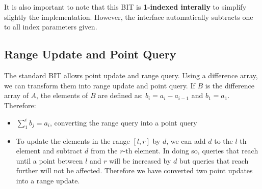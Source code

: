 \documentclass[12pt]{report}
\begin{document}
It is also important to note that this BIT is \textbf{1-indexed interally} to simplify slightly 
the implementation. However, the interface automatically subtracts one to all index parameters
given.
\subsection*{Range Update and Point Query}
The standard BIT allows point update and range query. Using a difference array, we can 
transform them into range update and point query. If $B$ is the difference array
of $A$, the elements of $B$ are defined as:  $b_i=a_i- a_{i-1}$ and $b_1=a_1$.
Therefore:
\begin{itemize}
		\setlength{\itemsep}{2pt}
		\item $\sum_{1}^i b_j=a_i$, converting the range query into 
				a point query
		\item To update the elements in the range $[l,r]$ by $d$, we can add
				$d$ to the $l$-th element and subtract $d$ from the $r$-th element.
				In doing so, queries that reach until a point
				between $l$ and $r$ will be increased by $d$ but queries that reach 
				further will not be affected.
				Therefore we have converted two point updates into a range update.

\end{itemize}
\end{document}
